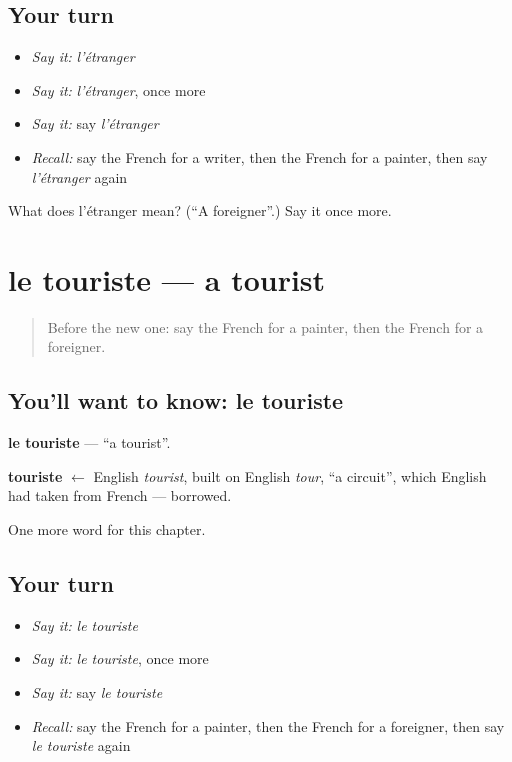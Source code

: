 \subsection*{Your turn}
\begin{itemize}
\raggedright
  \item \emph{Say it:} \emph{l'étranger}
  \item \emph{Say it:} \emph{l'étranger}, once more
  \item \emph{Say it:} say \emph{l'étranger}
  \item \emph{Recall:} say the French for a writer, then the French for a painter, then say \emph{l'étranger} again
\end{itemize}

\begin{tcolorbox}[breakable,colback=teal!4,colframe=teal!35!black,title={Before you move on}]
What does l'étranger mean? (\textquotedblleft{}A foreigner\textquotedblright{}.) Say it once more.
\end{tcolorbox}
\section[le touriste]{le touriste — a tourist}

\label{lesson:FR-C250-touriste}



\begin{quote}
Before the new one: say the French for a painter, then the French for a foreigner.
\end{quote}

\subsection*{You'll want to know: le touriste}
\textbf{le touriste} — \textquotedblleft{}a tourist\textquotedblright{}.

\begin{cousinweb}
\textbf{touriste} $\leftarrow$ English \emph{tourist}, built on English \emph{tour}, \textquotedblleft{}a circuit\textquotedblright{}, which English had taken from French — borrowed.
\end{cousinweb}

\begin{grammarlens}[title={What you've built}]
One more word for this chapter.
\end{grammarlens}

\subsection*{Your turn}
\begin{itemize}
\raggedright
  \item \emph{Say it:} \emph{le touriste}
  \item \emph{Say it:} \emph{le touriste}, once more
  \item \emph{Say it:} say \emph{le touriste}
  \item \emph{Recall:} say the French for a painter, then the French for a foreigner, then say \emph{le touriste} again
\end{itemize}

